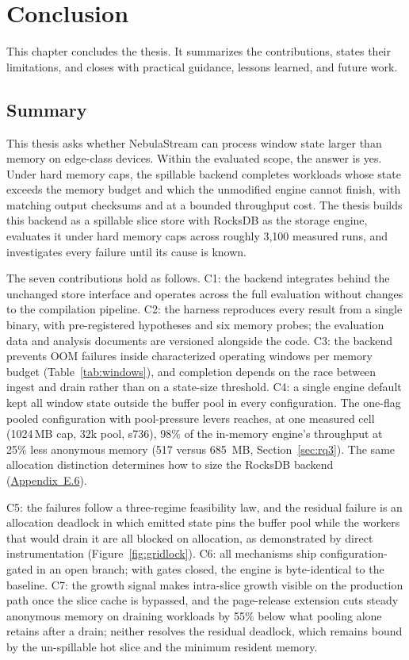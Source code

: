 \chapter{Conclusion\label{cha:conclusion}}

This chapter concludes the thesis. It summarizes the contributions, states their limitations, and closes with practical guidance, lessons learned, and future work.

\section{Summary\label{sec:summary}}

This thesis asks whether NebulaStream can process window state larger than memory on edge-class devices.
Within the evaluated scope, the answer is yes.
Under hard memory caps, the spillable backend completes workloads whose state exceeds the memory budget and which the unmodified engine cannot finish, with matching output checksums and at a bounded throughput cost.
The thesis builds this backend as a spillable slice store with RocksDB as the storage engine, evaluates it under hard memory caps across roughly 3{,}100 measured runs, and investigates every failure until its cause is known.

The seven contributions hold as follows.
C1: the backend integrates behind the unchanged store interface and operates across the full evaluation without changes to the compilation pipeline.
C2: the harness reproduces every result from a single binary, with pre-registered hypotheses and six memory probes; the evaluation data and analysis documents are versioned alongside the code.
C3: the backend prevents OOM failures inside characterized operating windows per memory budget (Table~\ref{tab:windows}), and completion depends on the race between ingest and drain rather than on a state-size threshold.
C4: a single engine default kept all window state outside the buffer pool in every configuration.
The one-flag pooled configuration with pool-pressure levers reaches, at one measured cell (1024\,MB cap, 32k pool, s736), 98\% of the in-memory engine's throughput at 25\% less anonymous memory (517 versus 685\, MB, Section~\ref{sec:rq3}).
The same allocation distinction determines how to size the RocksDB backend (\hyperref[app:rb32]{Appendix~E.6}).

C5: the failures follow a three-regime feasibility law, and the residual failure is an allocation deadlock in which emitted state pins the buffer pool while the workers that would drain it are all blocked on allocation, as demonstrated by direct instrumentation (Figure~\ref{fig:gridlock}).
C6: all mechanisms ship configuration-gated in an open branch; with gates closed, the engine is byte-identical to the baseline.
C7: the growth signal makes intra-slice growth visible on the production path once the slice cache is bypassed, and the page-release extension cuts steady anonymous memory on draining workloads by 55\% below what pooling alone retains after a drain; neither resolves the residual deadlock, which remains bound by the un-spillable hot slice and the minimum resident memory.

